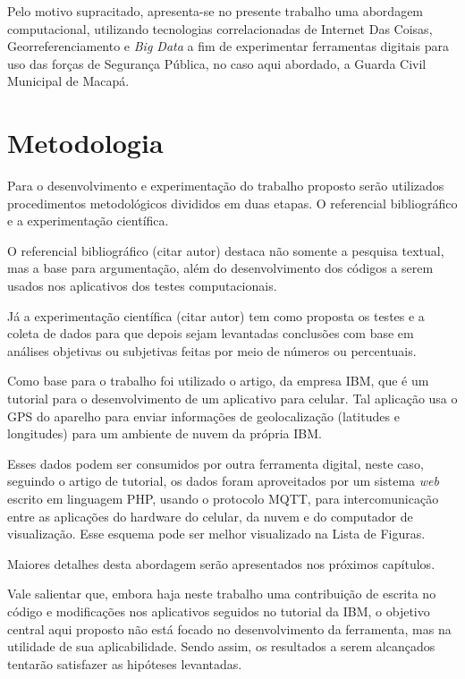 Pelo motivo supracitado, apresenta-se no presente trabalho uma abordagem computacional, utilizando tecnologias correlacionadas de Internet Das Coisas, Georreferenciamento e \textit{Big Data} a fim de experimentar ferramentas digitais para uso das forças de Segurança Pública, no caso aqui abordado, a Guarda Civil Municipal de Macapá.

\section {Metodologia}
Para o desenvolvimento e experimentação do trabalho proposto serão utilizados procedimentos metodológicos divididos em duas etapas. O referencial bibliográfico e a experimentação científica.

O referencial bibliográfico (citar autor) destaca não somente a pesquisa textual, mas a base para argumentação, além do desenvolvimento dos códigos a serem usados nos aplicativos dos testes computacionais.

Já a experimentação científica (citar autor) tem como proposta os testes e a coleta de dados para que depois sejam levantadas conclusões com base em análises objetivas ou subjetivas feitas por meio de números ou percentuais.

Como base para o trabalho foi utilizado o artigo, da empresa IBM\cite{IBM}, que é um tutorial para o desenvolvimento de um aplicativo para celular. Tal aplicação usa o GPS do aparelho para enviar informações de geolocalização (latitudes e longitudes) para um ambiente de nuvem da própria IBM.

Esses dados podem ser consumidos por outra ferramenta digital, neste caso, seguindo o artigo de tutorial, os dados foram aproveitados por um sistema \textit{web} escrito em linguagem PHP, usando o protocolo MQTT, para intercomunicação entre as aplicações do hardware do celular, da nuvem e do computador de visualização. Esse esquema pode ser melhor visualizado na Lista de Figuras.

Maiores detalhes desta abordagem serão apresentados nos próximos capítulos.

Vale salientar que, embora haja neste trabalho uma contribuição de escrita no código e modificações nos aplicativos seguidos no tutorial da IBM, o objetivo central aqui proposto não está focado no desenvolvimento da ferramenta, mas na utilidade de sua aplicabilidade. Sendo assim, os resultados a serem alcançados tentarão satisfazer as hipóteses levantadas. 
